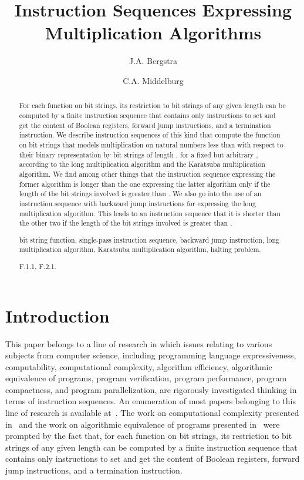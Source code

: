 \documentclass{llncs}
\title{Instruction Sequences Expressing \\ Multiplication Algorithms}
\author{J.A. Bergstra \and C.A. Middelburg}
\institute{Informatics Institute, Faculty of Science, University of
           Amsterdam, \\
           Science Park~904, 1098~XH Amsterdam, the Netherlands \\
           \email{J.A.Bergstra@uva.nl,C.A.Middelburg@uva.nl}}
\begin{document}
\maketitle

\begin{abstract}
For each function on bit strings, its restriction to bit strings of any 
given length can be computed by a finite instruction sequence that 
contains only instructions to set and get the content of Boolean 
registers, forward jump instructions, and a termination instruction.
We describe instruction sequences of this kind that compute the function 
on bit strings that models multiplication on natural numbers less than 
 with respect to their binary representation by bit strings of 
length , for a fixed but arbitrary , according to the long 
multiplication algorithm and the Karatsuba multiplication algorithm.
We find among other things that the instruction sequence expressing the 
former algorithm is longer than the one expressing the latter algorithm 
only if the length of the bit strings involved is greater than .
We also go into the use of an instruction sequence with backward jump 
instructions for expressing the long multiplication algorithm.
This leads to an instruction sequence that it is shorter than the other 
two if the length of the bit strings involved is greater than .
\begin{keywords} 
bit string function, 
single-pass instruction sequence, backward jump instruction, 
long multiplication algorithm, Karatsuba multiplication algorithm,
halting problem.
\end{keywords}\begin{classcode}
F.1.1, F.2.1.
\end{classcode}
\end{abstract}

\section{Introduction}
\label{sect-intro}

This paper belongs to a line of research in which issues relating to 
various subjects from computer science, including programming language
expressiveness, computability, computational complexity, algorithm 
efficiency, algorithmic equivalence of programs, program verification, 
program performance, program compactness, and program parallelization, 
are rigorously investigated thinking in terms of instruction sequences.
An enumeration of most papers belonging to this line of research is 
available at~\cite{SiteIS}.
The work on computational complexity presented in~\cite{BM13a,BM14e} and 
the work on algorithmic equivalence of programs presented 
in~\cite{BM14a} were prompted by the fact that, for each function on bit 
strings, its restriction to bit strings of any given length can be 
computed by a finite instruction sequence that contains only 
instructions to set and get the content of Boolean registers, forward 
jump instructions, and a termination instruction.
\end{document}
